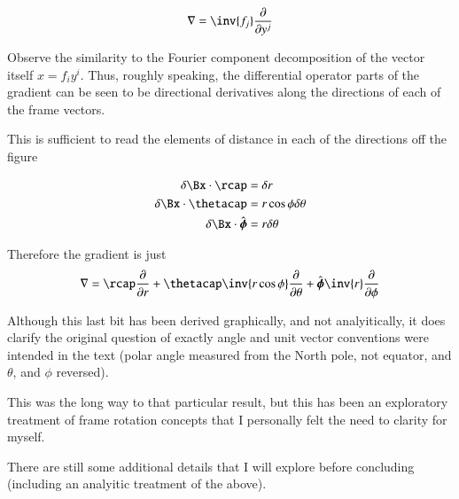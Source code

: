 \documentclass{article}
\newcommand{\phicap}[0]{\hat{\boldsymbol{\phi}}}
\begin{document}
\begin{align*}
\grad &= \inv{f_j} \PD{y^j}{} \\
\end{align*}

Observe the similarity to the Fourier component decomposition of the vector itself $x = f_i y^i$.  Thus, roughly speaking, the differential operator
parts of the gradient can be seen to be directional derivatives 
along the directions of each of the frame vectors.

This is sufficient to read the elements of distance in each of the directions
off the figure

\begin{align*}
\delta \Bx \cdot \rcap &= \delta r \\
\delta \Bx \cdot \thetacap &= r \cos\phi \delta \theta \\
\delta \Bx \cdot \phicap &= r \delta \theta \\
\end{align*}

Therefore the gradient is just
\begin{align}
\grad = 
\rcap \PD{r}{}
+\thetacap \inv{r \cos\phi} \PD{\theta}{} 
+\phicap \inv{r} \PD{\phi}{}
\end{align}

Although this last bit has been
derived graphically, and not analyitically, it does
clarify the original question of exactly angle and unit vector 
conventions were intended in the text (polar angle measured from the North pole, not equator, and $\theta$, and $\phi$ reversed).

This was the long way to that particular result, but this has been
an exploratory treatment of frame rotation concepts that I personally 
felt the need to clarity for myself.

There are still some additional details that I will explore before concluding
(including an analyitic treatment of the above).
\end{document}

